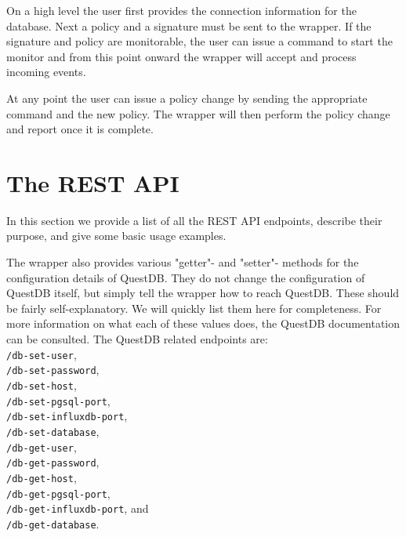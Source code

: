 On a high level the user first provides the connection information for the database.
Next a policy and a signature must be sent to the wrapper.
If the signature and policy are monitorable, the user can issue a command to start the monitor and from this point onward the wrapper will accept and process incoming events.

At any point the user can issue a policy change by sending the appropriate command and the new policy.
The wrapper will then perform the policy change and report once it is complete.

\section{The REST API}

In this section we provide a list of all the REST API endpoints, describe their purpose, and give some basic usage examples.



The wrapper also provides various "getter"- and "setter"- methods for the configuration details of QuestDB.
They do not change the configuration of QuestDB itself, but simply tell the wrapper how to reach QuestDB.
These should be fairly self-explanatory.
We will quickly list them here for completeness. 
For more information on what each of these values does, the QuestDB documentation \cite{questdb,questdb-postgres-wire,questdb-influx-db-line-protocol} can be consulted.
The QuestDB related endpoints are:\\
\texttt{/db-set-user}, \\
\texttt{/db-set-password}, \\
\texttt{/db-set-host}, \\
\texttt{/db-set-pgsql-port}, \\
\texttt{/db-set-influxdb-port}, \\
\texttt{/db-set-database}, \\
\texttt{/db-get-user}, \\
\texttt{/db-get-password}, \\
\texttt{/db-get-host}, \\
\texttt{/db-get-pgsql-port},\\
\texttt{/db-get-influxdb-port}, and \\
\texttt{/db-get-database}.






